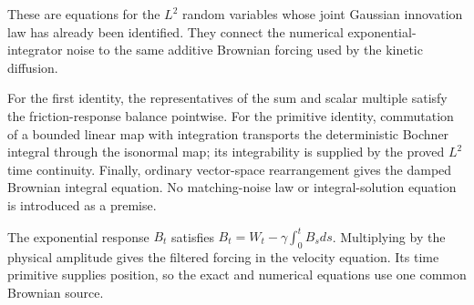 \documentclass[11pt,a4paper]{article}
\begin{document}
These are equations for the \(L^{2}\) random variables whose joint Gaussian innovation law has already been identified. They connect the numerical exponential-integrator noise to the same additive Brownian forcing used by the kinetic diffusion.



For the first identity, the representatives of the sum and scalar multiple satisfy the friction-response balance pointwise. For the primitive identity, commutation of a bounded linear map with integration transports the deterministic Bochner integral through the isonormal map; its integrability is supplied by the proved \(L^{2}\) time continuity. Finally, ordinary vector-space rearrangement gives the damped Brownian integral equation. No matching-noise law or integral-solution equation is introduced as a premise.



The exponential response \(B_t\) satisfies \(B_t=W_t-\gamma\int_0^tB_sds\). Multiplying by the physical amplitude gives the filtered forcing in the velocity equation. Its time primitive supplies position, so the exact and numerical equations use one common Brownian source.
\end{document}
